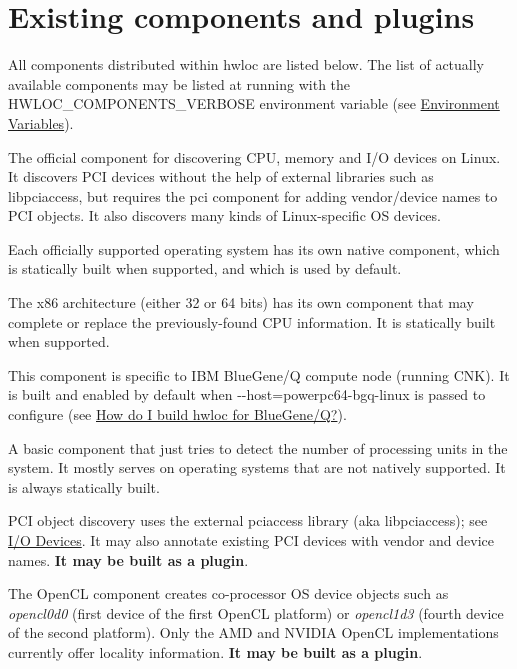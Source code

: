  \hypertarget{a00392_plugins_list}{}\section{Existing components and plugins}\label{a00392_plugins_list}
All components distributed within hwloc are listed below. The list of actually available components may be listed at running with the {\ttfamily H\+W\+L\+O\+C\+\_\+\+C\+O\+M\+P\+O\+N\+E\+N\+T\+S\+\_\+\+V\+E\+R\+B\+O\+SE} environment variable (see \hyperlink{a00382}{Environment Variables}).


\begin{DoxyDescription}
\item[linux ]The official component for discovering C\+PU, memory and I/O devices on Linux. It discovers P\+CI devices without the help of external libraries such as libpciaccess, but requires the pci component for adding vendor/device names to P\+CI objects. It also discovers many kinds of Linux-\/specific OS devices.  
\item[aix, darwin, freebsd, hpux, netbsd, solaris, windows ]Each officially supported operating system has its own native component, which is statically built when supported, and which is used by default.  
\item[x86 ]The x86 architecture (either 32 or 64 bits) has its own component that may complete or replace the previously-\/found C\+PU information. It is statically built when supported.  
\item[bgq ]This component is specific to I\+BM Blue\+Gene/Q compute node (running C\+NK). It is built and enabled by default when {\ttfamily -\/-\/host=powerpc64-\/bgq-\/linux} is passed to configure (see \hyperlink{a00394_faq_bgq}{How do I build hwloc for Blue\+Gene/Q?}).  
\item[no\+\_\+os ]A basic component that just tries to detect the number of processing units in the system. It mostly serves on operating systems that are not natively supported. It is always statically built.  
\item[pci ]P\+CI object discovery uses the external pciaccess library (aka libpciaccess); see \hyperlink{a00384}{I/O Devices}. It may also annotate existing P\+CI devices with vendor and device names. {\bfseries It may be built as a plugin}.  
\item[opencl ]The Open\+CL component creates co-\/processor OS device objects such as {\itshape opencl0d0} (first device of the first Open\+CL platform) or {\itshape opencl1d3} (fourth device of the second platform). Only the A\+MD and N\+V\+I\+D\+IA Open\+CL implementations currently offer locality information. {\bfseries It may be built as a plugin}.  

\end{DoxyDescription}
